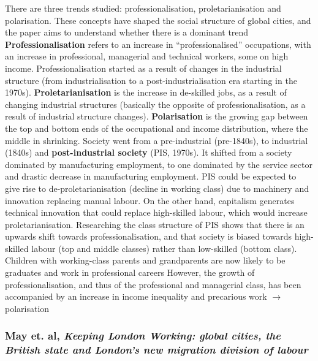 \documentclass{article}
\begin{document}
\begin{outline}
	\1 There are three trends studied: professionalisation, proletarianisation and polarisation. These concepts have shaped the social structure of global cities, and the paper aims to understand whether there is a dominant trend
	\1 \textbf{Professionalisation} refers to an increase in ``professionalised'' occupations, with an increase in professional, managerial and technical workers, some on high income. Professionalisation started as a result of changes in the industrial structure (from industrialisation to a post-industrialisation era starting in the 1970s).
	\1 \textbf{Proletarianisation} is the increase in de-skilled jobs, as a result of changing industrial structures (basically the opposite of professionalisation, as a result of industrial structure changes).
	\1 \textbf{Polarisation} is the growing gap between the top and bottom ends of the occupational and income distribution, where the middle in shrinking.
	\1 Society went from a pre-industrial (pre-1840s), to industrial (1840s) and \textbf{post-industrial society} (PIS, 1970s). 
		\2 It shifted from a society dominated by manufacturing employment, to one dominated by the service sector and drastic decrease in manufacturing employment. PIS could be expected to give rise to de-proletarianisation (decline in working class) due to machinery and innovation replacing manual labour. On the other hand, capitalism generates technical innovation that could replace high-skilled labour, which would increase proletarianisation.
		\2 Researching the class structure of PIS shows that there is an upwards shift towards professionalisation, and that society is biased towards high-skilled labour (top and middle classes) rather than low-skilled (bottom class). Children with working-class parents and grandparents are now likely to be graduates and work in professional careers
		\2 However, the growth of professionalisation, and thus of the professional and managerial class, has been accompanied by an increase in income inequality and precarious work $\rightarrow$ polarisation
 \end{outline}

\subsubsection{May et. al, \textit{Keeping London Working: global cities, the British state and London's new migration division of labour}}
\end{document}
